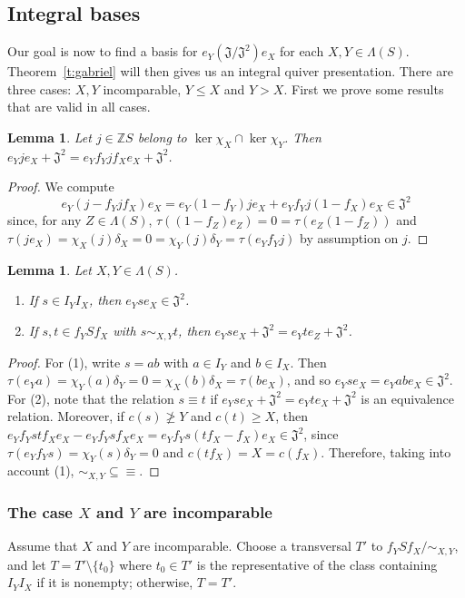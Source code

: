 \documentclass[reqno,11pt]{amsart}
\newtheorem{Lemma}[Thm]{Lemma}
{\theoremstyle{definition}
\newtheorem{Def}[Thm]{Definition}}
{\theoremstyle{remark}
\newtheorem{Rmk}[Thm]{Remark}}
\numberwithin{equation}{section}
\begin{document}
\subsection{Integral bases}
Our goal is now to find a basis for $e_Y(\mathfrak J/\mathfrak J^2)e_X$ for each $X,Y\in \Lambda(S)$.  Theorem~\ref{t:gabriel} will then gives us an integral quiver presentation.  There are three cases: $X,Y$ incomparable, $Y\leq X$ and $Y>X$.  First we prove some results that are valid in all cases.

\begin{Lemma}\label{l:sandwichfyfx}
    Let $j\in \mathbb ZS$ belong to $\ker\chi_X\cap \ker\chi_Y$.  Then $e_Yje_X+\mathfrak J^2= e_Yf_Yjf_Xe_X+\mathfrak J^2$. 
\end{Lemma}
\begin{proof}
    We compute \[e_Y(j-f_Yjf_X)e_X = e_Y(1-f_Y)je_X + e_Yf_Yj(1-f_X)e_X\in \mathfrak J^2\] since, for any $Z\in \Lambda(S)$, $\tau((1-f_Z)e_Z)=0=\tau(e_Z(1-f_Z))$ and $\tau(je_X)=\chi_X(j)\delta_X=0=\chi_Y(j)\delta_Y = \tau(e_Yf_Yj)$ by assumption on $j$.
\end{proof}

\begin{Lemma}\label{l:equiv.mod.rad}
    Let $X,Y\in \Lambda(S)$.
    \begin{enumerate}
        \item If $s\in I_YI_X$, then $e_Yse_X\in \mathfrak J^2$.
        \item If $s,t\in f_YSf_X$ with $s\sim_{X,Y}t$, then $e_Yse_X+\mathfrak J^2= e_Yte_Z+\mathfrak J^2$.
    \end{enumerate}
\end{Lemma}
\begin{proof}
    For (1), write $s=ab$ with $a\in I_Y$ and $b\in I_X$.  Then $\tau(e_Ya) = \chi_Y(a)\delta_Y=0=\chi_X(b)\delta_X = \tau(be_X)$, and so $e_Yse_X = e_Yabe_X\in \mathfrak J^2$.
    For (2), note that the relation $s\equiv t$ if $e_Yse_X+\mathfrak J^2 = e_Yte_X+\mathfrak J^2$ is an equivalence relation.  Moreover, if $c(s)\ngeq Y$ and $c(t)\geq X$, then $e_Yf_Ystf_Xe_X- e_Yf_Ysf_Xe_X = e_Yf_Ys(tf_X-f_X)e_X\in \mathfrak J^2$, since $\tau(e_Yf_Ys) = \chi_Y(s)\delta_Y =0$ and $c(tf_X)=X=c(f_X)$.  Therefore, taking into account (1), ${\sim_{X,Y}}\subseteq {\equiv}$.
 \end{proof}

\subsubsection{The case $X$ and $Y$ are incomparable}  Assume that $X$ and $Y$ are incomparable.
Choose a transversal $T'$ to $f_YSf_X/{\sim_{X,Y}}$, and let $T=T'\setminus \{t_0\}$ where $t_0\in T'$ is the representative of the class containing $I_YI_X$ if it is nonempty; otherwise, $T=T'$.
\end{document}
